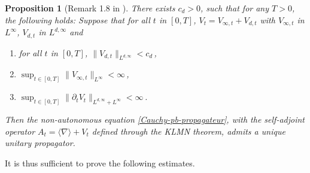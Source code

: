 \documentclass[12pt]{article}
\newcommand{\jnabla}{{\langle\nabla\rangle}}
\theoremstyle{plain}
\newtheorem{prop}[theo]{Proposition}
\begin{document}
\begin{prop}[Remark 1.8 in \cite{BFG2a}]\label{cor:existence-unitary-propagator-for-time-dependent-potential} There exists $c_d>0$, such that for any $T>0$, the following holds: Suppose that for all $t$ in $[0,T]$,  $V_t=V_{\infty,t}+V_{d,t}$ with $V_{\infty,t}$ in $L^\infty$, $V_{d,t}$ in $L^{d,\infty}$ and
\begin{enumerate}
    \item \label{item:borne-Vd} for all $t$ in $[0,T]$, $\|V_{d,t}\|_{L^{d,\infty}}<c_{d}$\,,
    \item \label{item:borne-Vinfty} $\sup_{t\in [0,T]}\|V_{\infty,t}\|_{L^\infty}<\infty$\,,
    \item \label{item:borne-dtV}$ \sup_{t\in [0,T]}\|\partial_t V_t\|_{L^{d,\infty}+L^\infty} < \infty$\,.
\end{enumerate}
Then the non-autonomous equation \eqref{Cauchy-pb-propagateur}, with the self-adjoint operator $A_t = \jnabla +V_t$ defined through the KLMN theorem,  admits a unique unitary propagator.
\end{prop}


It is thus sufficient to prove the following estimates.
\end{document}
